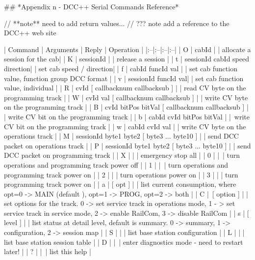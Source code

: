 ## *Appendix n - DCC++ Serial Commands Reference*

// **note** need to add return values...
// ??? note add a reference to the DCC++ web site

| Command | Arguments | Reply | Operation |
|:--|:--|:--|:--|
| O | cabId | | allocate a session for the cab|
| K | sessionId | | release a session |
| t | sessionId cabId speed direction| | set cab speed / direction|
| f | cabId funcId val | | set cab function value, function group DCC format |
| v | sessionId funcId val| | set cab function value, individual |
| R | cvId [ callbacknum callbacksub ] | | read CV byte on the programming track |
| W | cvId val [ callbacknum callbacksub ] | | write CV byte on the programming track |
| B | cvId bitPos bitVal [ callbacknum callbacksub ] | | write CV bit on the programming track |
| b | cabId cvId bitPos bitVal | | write CV bit on the programming track |
| w | cabId cvId val | | write CV byte on the operations track |
| M | sessionId byte1 byte2 [ byte3 ... byte10 ] | | send DCC packet on operations track |
| P | sessionId byte1 byte2 [ byte3 ... byte10 ] | | send DCC packet on programming track |
| X | | | emergency stop all |
| 0 | | | turn operations and programming track power off |
| 1 | | | turn operations and programming track power on |
| 2 | | | turn operations power on |
| 3 | | | turn programming track power on |
| a | [ opt ] | | list current consumption, where opt=0 -> MAIN (default ), opt=1 -> PROG, opt=2 -> both |
| C | [ option ] | | set options for the track. 0 -> set service track in operations mode, 1 - > set service track in service mode, 2 -> enable RailCom, 3 -> disable RailCom |
| s | [ level ] | | list status at detail level, default is summary. 0 -> summary, 1 -> configuration,  2 -> session map |
| S | | | list base station configuration |
| L | | | list base station session table |
| D | | | enter diagnostics mode - need to restart later! |
| ? | | | list this help |
